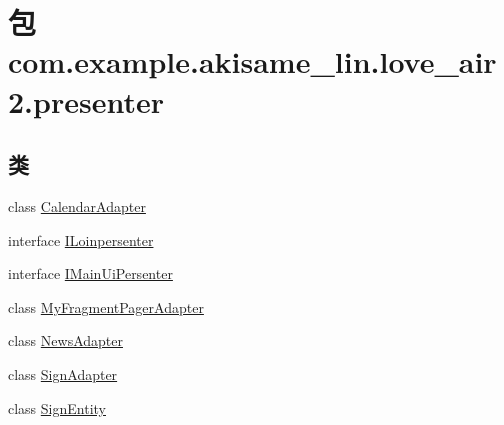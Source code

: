 \hypertarget{namespacecom_1_1example_1_1akisame__lin_1_1love__air2_1_1presenter}{}\section{包 com.\+example.\+akisame\+\_\+lin.\+love\+\_\+air2.\+presenter}
\label{namespacecom_1_1example_1_1akisame__lin_1_1love__air2_1_1presenter}
\subsection*{类}
\begin{DoxyCompactItemize}
\item 
class \mbox{\hyperlink{classcom_1_1example_1_1akisame__lin_1_1love__air2_1_1presenter_1_1_calendar_adapter}{Calendar\+Adapter}}
\item 
interface \mbox{\hyperlink{interfacecom_1_1example_1_1akisame__lin_1_1love__air2_1_1presenter_1_1_i_loinpersenter}{I\+Loinpersenter}}
\item 
interface \mbox{\hyperlink{interfacecom_1_1example_1_1akisame__lin_1_1love__air2_1_1presenter_1_1_i_main_ui_persenter}{I\+Main\+Ui\+Persenter}}
\item 
class \mbox{\hyperlink{classcom_1_1example_1_1akisame__lin_1_1love__air2_1_1presenter_1_1_my_fragment_pager_adapter}{My\+Fragment\+Pager\+Adapter}}
\item 
class \mbox{\hyperlink{classcom_1_1example_1_1akisame__lin_1_1love__air2_1_1presenter_1_1_news_adapter}{News\+Adapter}}
\item 
class \mbox{\hyperlink{classcom_1_1example_1_1akisame__lin_1_1love__air2_1_1presenter_1_1_sign_adapter}{Sign\+Adapter}}
\item 
class \mbox{\hyperlink{classcom_1_1example_1_1akisame__lin_1_1love__air2_1_1presenter_1_1_sign_entity}{Sign\+Entity}}
\end{DoxyCompactItemize}
